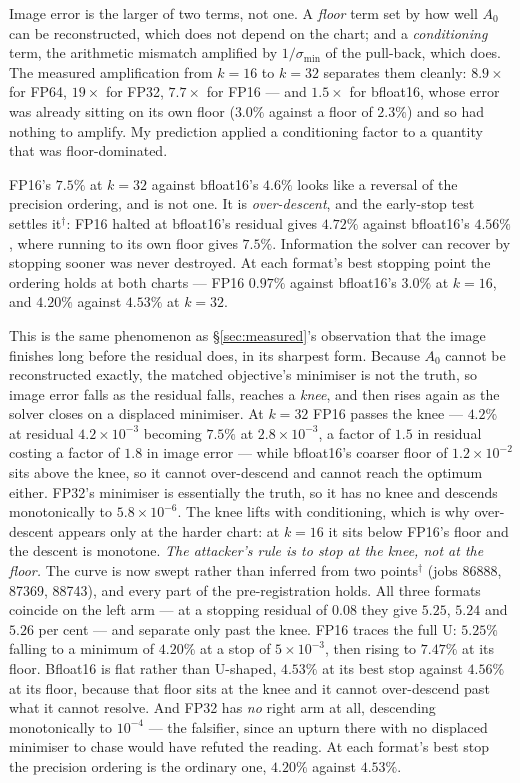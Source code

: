 Image error is the larger of two terms, not one. A \emph{floor} term set by
how well $A_0$ can be reconstructed, which does not depend on the chart; and a
\emph{conditioning} term, the arithmetic mismatch amplified by
$1/\sigma_{\min}$ of the pull-back, which does. The measured amplification
from $k=16$ to $k=32$ separates them cleanly: $8.9\times$ for FP64,
$19\times$ for FP32, $7.7\times$ for FP16 --- and $1.5\times$ for bfloat16,
whose error was already sitting on its own floor ($3.0\%$ against a floor of
$2.3\%$) and so had nothing to amplify. My prediction applied a conditioning
factor to a quantity that was floor-dominated.

FP16's $7.5\%$ at $k=32$ against bfloat16's $4.6\%$ looks like a reversal of
the precision ordering, and is not one. It is \emph{over-descent}, and the
early-stop test settles it$^\dagger$: FP16 halted at bfloat16's residual gives
$4.72\%$ against bfloat16's $4.56\%$, where running to its own floor gives
$7.5\%$. Information the solver can recover by stopping sooner was never
destroyed. At each format's best stopping point the ordering holds at both
charts --- FP16 $0.97\%$ against bfloat16's $3.0\%$ at $k=16$, and $4.20\%$
against $4.53\%$ at $k=32$.

This is the same phenomenon as \S\ref{sec:measured}'s observation that the
image finishes long before the residual does, in its sharpest form. Because
$A_0$ cannot be reconstructed exactly, the matched objective's minimiser is
not the truth, so image error falls as the residual falls, reaches a
\emph{knee}, and then rises again as the solver closes on a displaced
minimiser. At $k=32$ FP16 passes the knee --- $4.2\%$ at residual
$4.2\times10^{-3}$ becoming $7.5\%$ at $2.8\times10^{-3}$, a factor of $1.5$
in residual costing a factor of $1.8$ in image error --- while bfloat16's
coarser floor of $1.2\times10^{-2}$ sits above the knee, so it cannot
over-descend and cannot reach the optimum either. FP32's minimiser is
essentially the truth, so it has no knee and descends monotonically to
$5.8\times10^{-6}$. The knee lifts with conditioning, which is why
over-descent appears only at the harder chart: at $k=16$ it sits below FP16's
floor and the descent is monotone. \emph{The attacker's rule is to stop at the
knee, not at the floor.} The curve is now swept rather than inferred from two
points$^\dagger$ (jobs 86888, 87369, 88743), and every part of the
pre-registration holds. All three formats coincide on the left arm --- at a
stopping residual of $0.08$ they give $5.25$, $5.24$ and $5.26$ per cent ---
and separate only past the knee. FP16 traces the full U: $5.25\%$ falling to a
minimum of $4.20\%$ at a stop of $5\times10^{-3}$, then rising to $7.47\%$ at
its floor. Bfloat16 is flat rather than U-shaped, $4.53\%$ at its best stop
against $4.56\%$ at its floor, because that floor sits at the knee and it
cannot over-descend past what it cannot resolve. And FP32 has \emph{no} right
arm at all, descending monotonically to $10^{-4}$ --- the falsifier, since an
upturn there with no displaced minimiser to chase would have refuted the
reading. At each format's best stop the precision ordering is the ordinary one,
$4.20\%$ against $4.53\%$.

